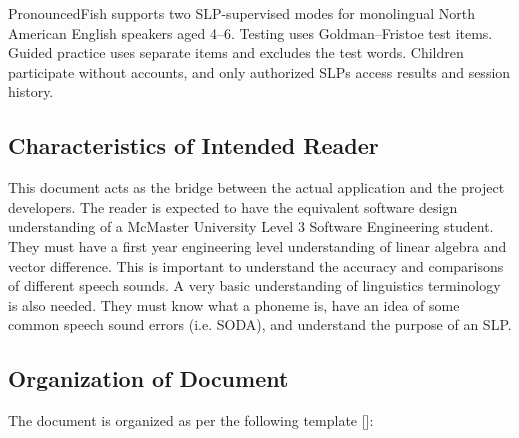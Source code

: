 \documentclass[12pt]{article}
\begin{document}
PronouncedFish supports two SLP-supervised modes for monolingual North
American English speakers aged 4--6. Testing uses Goldman--Fristoe test
items. Guided practice uses separate items and excludes the test words.
Children participate without accounts, and only authorized SLPs access
results and session history.


\subsection{Characteristics of Intended Reader} \label{sec_IntendedReader}

This document acts as the bridge between the actual application and the project developers. The reader is expected to have the equivalent software design understanding of a McMaster University Level 3 Software Engineering student. They must have a first year engineering level understanding of linear algebra and vector difference. This is important to understand the accuracy and comparisons of different speech sounds. A very basic understanding of linguistics terminology is also needed. They must know what a phoneme is, have an idea of some common speech sound errors (i.e. SODA), and understand the purpose of an SLP. 

\subsection{Organization of Document}

The document is organized as per the following template [\citet{SmithAndLai2005, SmithEtAl2007, SmithAndKoothoor2016}]:
\end{document}
